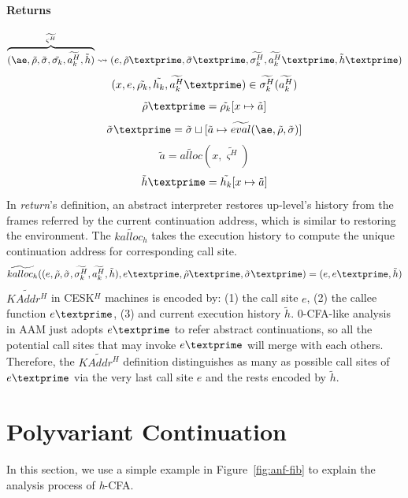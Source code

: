 \documentclass[12pt]{report}
\begin{document}
\paragraph{Returns}
\[
\overbrace{
(\ae, \tilde{\rho}, \tilde{\sigma}, \tilde{\sigma_k}, \widetilde{a_k^H}, \tilde{h})
}^{\widetilde{\varsigma^H}}
\leadsto (e, \tilde{\rho}\textprime, \tilde{\sigma}\textprime, \widetilde{\sigma_k^H}, \widetilde{a_k^H}\textprime, \tilde{h}\textprime)
\]
\[
(x, e, \tilde{\rho_k}, \tilde{h_k}, \widetilde{a_k^H}\textprime) \in \widetilde{\sigma_k^H}(\widetilde{a_k^H})
\]
\[
\tilde{\rho}\textprime = \tilde{\rho_k}[x \mapsto \tilde{a}]
\]
\[
\tilde{\sigma}\textprime = \tilde{\sigma} \sqcup [\tilde{a} \mapsto \widetilde{eval}(\ae, \tilde{\rho}, \tilde{\sigma})]
\]
\[
\tilde{a} = \widetilde{alloc}(x, \widetilde{\varsigma^H})
\]
\[
\tilde{h}\textprime = \tilde{h_k}[x \mapsto \tilde{a}]
\]
In {\em return}'s definition, an abstract interpreter restores up-level's history from the frames referred by the current continuation address, which is similar to restoring the environment.
The $\widetilde{kalloc_h}$ takes the execution history to compute the unique continuation address for corresponding call site.
\[
\widetilde{kalloc_h} ((e, \tilde{\rho}, \tilde{\sigma}, \widetilde{\sigma_k^H}, \widetilde{a_k^H}, \tilde{h}), e\textprime, \tilde{\rho}\textprime, \tilde{\sigma}\textprime) =
(e, e\textprime, \tilde{h})
\]
$\widetilde{KAddr^H}$ in CESK$^H$ machines is encoded by: (1) the call site $e$, (2) the callee function $e\textprime$, (3) and current execution history $\tilde{h}$. 0-CFA-like analysis in AAM just adopts $e\textprime$ to refer abstract continuations, so all the potential call sites that may invoke $e\textprime$ will merge with each others. Therefore, the $\widetilde{KAddr^H}$ definition distinguishes as many as possible call sites of $e\textprime$ via the very last call site $e$ and the rests encoded by $\tilde{h}$.

\section{Polyvariant Continuation}
\label{sub:Polyvariant Continuation}
In this section, we use a simple example in Figure~\ref{fig:anf-fib} to explain the analysis process of
\textit{h}-CFA.
\end{document}
